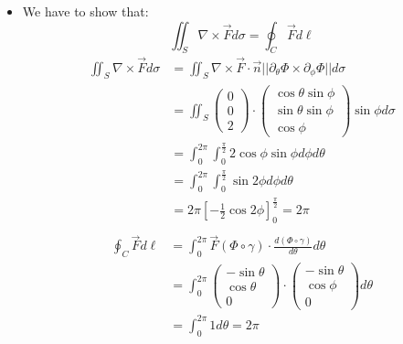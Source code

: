 \documentclass[11pt]{article}
\begin{document}
\begin{solution}
\begin{itemize}
    \item 
    We have to show that:
    $$
    \iint_S \nabla \times \vec{F} d\sigma = \oint_C \vec{F} d\ell
    $$
    \begin{align*}
        \iint_S \nabla \times \vec{F} d\sigma &= \iint_S \nabla \times \vec{F}\cdot \vec{n}||\partial_{\theta}\Phi\times \partial_{\phi}\Phi|| d\sigma\\
        &= \iint_S \begin{pmatrix} 0\\ 0\\ 2 \end{pmatrix}\cdot \begin{pmatrix}\cos\theta\sin\phi \\ \sin\theta\sin\phi\\ \cos\phi\end{pmatrix}\sin\phi d\sigma\\
        &= \int_0^{2\pi}\int_0^{\frac{\pi}{2}} 2\cos\phi\sin\phi d\phi d\theta\\
        &= \int_0^{2\pi}\int_0^{\frac{\pi}{2}} \sin2\phi d\phi d\theta\\
        &= 2\pi \left[ -\frac{1}{2}\cos2\phi \right]_0^{\frac{\pi}{2}} = 2\pi\\
    \end{align*}   
    \begin{align*}
        \oint_C \vec{F} d\ell &= \int_0^{2\pi} \vec{F}(\Phi\circ \gamma)\cdot \frac{d(\Phi\circ \gamma)}{d\theta}  d \theta\\
        &= \int_0^{2\pi} \begin{pmatrix} -\sin\theta\\ \cos\theta\\ 0 \end{pmatrix}\cdot \begin{pmatrix}-\sin\theta \\ \cos\phi \\ 0\end{pmatrix} d \theta\\
        &= \int_0^{2\pi} 1 d \theta = 2\pi\\
    \end{align*}   
    \end{itemize}
\end{solution}
\end{document}
